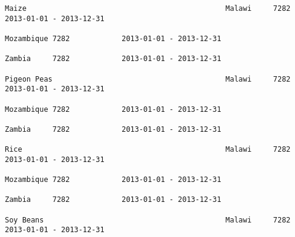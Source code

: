 \documentclass[11pt]{article}
\begin{document}
\begin{Verbatim}[commandchars=\\\{\}]
                                                                                                                                                              Maize                                              Malawi     7282            2013-01-01 - 2013-12-31   
                                                                                                                                                                                                                 Mozambique 7282            2013-01-01 - 2013-12-31   
                                                                                                                                                                                                                 Zambia     7282            2013-01-01 - 2013-12-31   
                                                                                                                                                              Pigeon Peas                                        Malawi     7282            2013-01-01 - 2013-12-31   
                                                                                                                                                                                                                 Mozambique 7282            2013-01-01 - 2013-12-31   
                                                                                                                                                                                                                 Zambia     7282            2013-01-01 - 2013-12-31   
                                                                                                                                                              Rice                                               Malawi     7282            2013-01-01 - 2013-12-31   
                                                                                                                                                                                                                 Mozambique 7282            2013-01-01 - 2013-12-31   
                                                                                                                                                                                                                 Zambia     7282            2013-01-01 - 2013-12-31   
                                                                                                                                                              Soy Beans                                          Malawi     7282            2013-01-01 - 2013-12-31   

\end{Verbatim}
\end{document}
